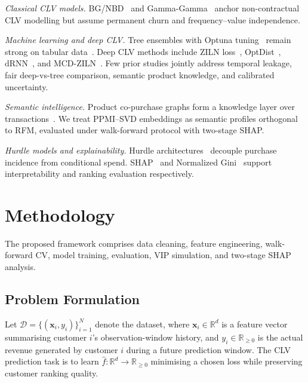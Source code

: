 \documentclass[pdflatex,sn-mathphys-num]{sn-jnl}
\theoremstyle{thmstyleone}
\theoremstyle{thmstyletwo}
\theoremstyle{thmstylethree}
\begin{document}
\textit{Classical CLV models.} BG/NBD~\cite{fader2005counting} and
Gamma-Gamma~\cite{fader2013gammagamma} anchor non-contractual CLV
modelling but assume permanent churn and frequency--value independence.

\textit{Machine learning and deep CLV.} Tree ensembles with Optuna
tuning~\cite{akiba2019optuna} remain strong on tabular
data~\cite{grinsztajn2022treesvsnn}. Deep CLV methods include ZILN
loss~\cite{wang2019deep}, OptDist~\cite{tang2024optdist},
dRNN~\cite{meta2024drnn}, and MCD-ZILN~\cite{mcd2024clv}. Few prior
studies jointly address temporal leakage, fair deep-vs-tree
comparison, semantic product knowledge, and calibrated uncertainty.

\textit{Semantic intelligence.} Product co-purchase graphs form a
knowledge layer over transactions~\cite{bullinaria2007extracting,
levy2014neural,linden2003amazon}. We treat PPMI--SVD embeddings as
semantic profiles orthogonal to RFM, evaluated under walk-forward
protocol with two-stage SHAP.

\textit{Hurdle models and explainability.}
Hurdle architectures~\cite{mullahy1986specification,cragg1971statistical}
decouple purchase incidence from conditional spend. SHAP~\cite{lundberg2017unified}
and Normalized Gini~\cite{wang2019deep} support interpretability and
ranking evaluation respectively.

\section{Methodology}\label{sec:methodology}

The proposed framework comprises data cleaning, feature engineering,
walk-forward CV, model training, evaluation, VIP simulation, and
two-stage SHAP analysis.

\subsection{Problem Formulation}

Let $\mathcal{D} = \{(\mathbf{x}_i, y_i)\}_{i=1}^{N}$ denote the dataset,
where $\mathbf{x}_i \in \mathbb{R}^d$ is a feature vector summarising
customer $i$'s observation-window history, and $y_i \in \mathbb{R}_{\geq 0}$
is the actual revenue generated by customer $i$ during a future prediction
window. The CLV prediction task is to learn $\hat{f}: \mathbb{R}^d \to
\mathbb{R}_{\geq 0}$ minimising a chosen loss while preserving customer
ranking quality.
\end{document}
